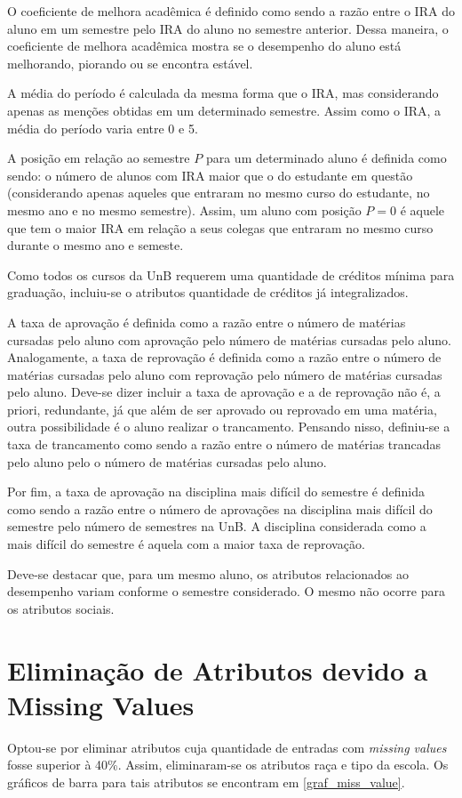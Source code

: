 \par O coeficiente de melhora acadêmica é definido como sendo a razão entre o IRA do
aluno em um semestre pelo IRA do aluno no semestre anterior. Dessa maneira, o
coeficiente de melhora acadêmica mostra se o desempenho do aluno está
melhorando, piorando ou se encontra estável.  
\par A média do período é calculada da mesma forma que o IRA, mas considerando apenas
as menções obtidas em um determinado semestre. Assim como o IRA, a média do período
varia entre 0 e 5.
\par A posição em relação ao semestre $P$ para um determinado aluno é definida como sendo:
o número de alunos com IRA maior que o do estudante em questão
(considerando apenas aqueles que entraram no mesmo curso do estudante, no mesmo ano e
no mesmo semestre). Assim, um aluno com posição $P = 0$ é aquele que tem o maior
IRA em relação a seus colegas que entraram no mesmo curso durante o mesmo ano e
semeste.  
\par Como todos os cursos da UnB requerem uma quantidade de créditos mínima para
graduação, incluiu-se o atributos quantidade de créditos já integralizados. 
\par A taxa de aprovação é definida como a razão entre o número de matérias cursadas
pelo aluno com aprovação pelo número de matérias cursadas pelo aluno. Analogamente, a
taxa de reprovação é definida como a razão entre o número de matérias cursadas pelo
aluno com reprovação pelo número de matérias cursadas pelo aluno. Deve-se dizer
incluir a taxa de aprovação e a de reprovação não é, a priori, redundante, já que
além de ser aprovado ou reprovado em uma matéria, outra possibilidade é o aluno
realizar o trancamento.  Pensando nisso, definiu-se a taxa de trancamento como sendo
a razão entre o número de matérias trancadas pelo aluno pelo o número de matérias
cursadas pelo aluno.
\par Por fim, a taxa de aprovação na disciplina mais difícil do semestre é definida
como sendo a razão entre o número de aprovações na disciplina mais difícil do
semestre pelo número de semestres na UnB. A disciplina considerada como a mais
difícil do semestre é aquela com a maior taxa de reprovação. 
\par Deve-se destacar que, para um mesmo aluno, os atributos relacionados ao
desempenho variam conforme o semestre considerado. O mesmo não ocorre para os
atributos sociais. 

\section{Eliminação de Atributos devido a Missing Values}
Optou-se por eliminar atributos cuja quantidade de entradas com \textit{missing
values} fosse superior à 40\%. Assim, eliminaram-se os atributos raça e tipo da
escola. Os gráficos de barra para tais atributos se encontram em
\ref{graf_miss_value}.

